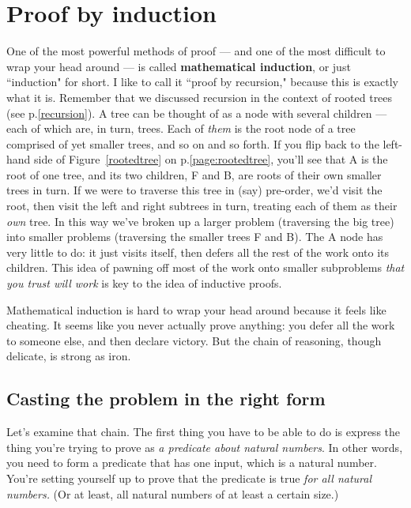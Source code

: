 
\section{Proof by induction}

One of the most powerful methods of proof --- and one of the most difficult
to wrap your head around --- is called \textbf{mathematical induction}, or
just ``induction" for short. I like to call it ``proof by recursion,"
because this is exactly what it is. Remember that we discussed recursion in
the context of rooted trees (see p.\ref{recursion}). A tree can be thought
of as a node with several children --- each of which are, in turn, trees.
Each of \textit{them} is the root node of a tree comprised of yet
smaller trees, and so on and so forth. If you flip back to the left-hand
side of Figure~\ref{rootedtree} on p.\ref{page:rootedtree}, you'll see that
A is the root of one tree, and its two children, F and B, are roots of
their own smaller trees in turn. If we were to traverse this tree in (say)
pre-order, we'd visit the root, then visit the left and right subtrees in
turn, treating each of them as their \textit{own} tree. In this way we've
broken up a larger problem (traversing the big tree) into smaller problems
(traversing the smaller trees F and B). The A node has very little to do:
it just visits itself, then defers all the rest of the work onto its
children. This idea of pawning off most of the work onto smaller
subproblems \textit{that you trust will work} is key to the idea of
inductive proofs.

Mathematical induction is hard to wrap your head around because it feels
like cheating. It seems like you never actually prove anything: you defer
all the work to someone else, and then declare victory. But the chain of
reasoning, though delicate, is strong as iron.

\subsection{Casting the problem in the right form}

Let's examine that chain. The first thing you have to be able to do is
express the thing you're trying to prove as \textit{a predicate about
natural numbers}. In other words, you need to form a predicate that has one
input, which is a natural number. You're setting yourself up to prove that
the predicate is true \textit{for all natural numbers.} (Or at least, all
natural numbers of at least a certain size.)

